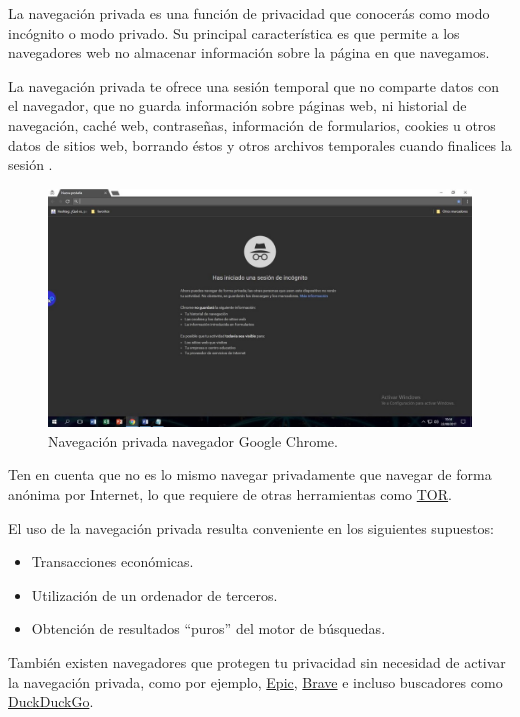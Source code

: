 \documentclass[
  spanish,
  a4paper,
  openany]{book}
\providecommand{\tightlist}{%
  \setlength{\itemsep}{0pt}\setlength{\parskip}{0pt}}
\begin{document}
La navegación privada es una función de privacidad que conocerás como modo incógnito o modo privado. Su principal característica es que permite a los navegadores web no almacenar información sobre la página en que navegamos.

La navegación privada te ofrece una sesión temporal que no comparte datos con el navegador, que no guarda información sobre páginas web, ni historial de navegación, caché web, contraseñas, información de formularios, cookies u otros datos de sitios web, borrando éstos y otros archivos temporales cuando finalices la sesión \citep{navegacion-privada}.

\begin{figure}

{\centering \includegraphics[width=0.75\linewidth]{images/navegacion-privada} 

}

\caption{Navegación privada navegador Google Chrome.}\label{fig:unnamed-chunk-4}
\end{figure}

Ten en cuenta que no es lo mismo navegar privadamente que navegar de forma anónima por Internet, lo que requiere de otras herramientas como \href{https://www.torproject.org/}{TOR}.

El uso de la navegación privada resulta conveniente en los siguientes supuestos:

\begin{itemize}
\tightlist
\item
  Transacciones económicas.
\item
  Utilización de un ordenador de terceros.
\item
  Obtención de resultados ``puros'' del motor de búsquedas.
\end{itemize}

También existen navegadores que protegen tu privacidad sin necesidad de activar la navegación privada, como por ejemplo, \href{https://www.epicbrowser.com/}{Epic}, \href{https://brave.com/es/}{Brave} e incluso buscadores como \href{https://duckduckgo.com/}{DuckDuckGo}.
\end{document}
